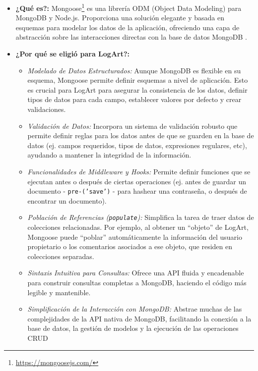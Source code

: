 \begin{itemize}
    \item \textbf{¿Qué es?:} Mongoose\footnote{\url{https://mongoosejs.com/}} es una librería ODM (Object Data Modeling) para MongoDB y Node.js. Proporciona una solución elegante y basada en esquemas para modelar los datos de la aplicación, ofreciendo una capa de abstracción sobre las interacciones directas con la base de datos MongoDB \cite{freecodecampMongooseIntro}.

    \item \textbf{¿Por qué se eligió para LogArt?:}
        \begin{itemize}
            \item \textit{Modelado de Datos Estructurados:} Aunque MongoDB es flexible en su esquema, Mongoose permite definir esquemas a nivel de aplicación. Esto es crucial para LogArt para asegurar la consistencia de los datos, definir tipos de datos para cada campo, establecer valores por defecto y crear validaciones.
            \item \textit{Validación de Datos:} Incorpora un sistema de validación robusto que permite definir reglas para los datos antes de que se guarden en la base de datos (ej. campos requeridos, tipos de datos, expresiones regulares, etc), ayudando a mantener la integridad de la información.
            \item \textit{Funcionalidades de Middleware y Hooks:} Permite definir funciones que se ejecutan antes o después de ciertas operaciones (ej. antes de guardar un documento - \texttt{pre-('save')} - para hashear una contraseña, o después de encontrar un documento).
            \item \textit{Población de Referencias (\texttt{populate}):} Simplifica la tarea de traer datos de colecciones relacionadas. Por ejemplo, al obtener un ``objeto'' de LogArt, Mongoose puede ``poblar'' automáticamente la información del usuario propietario o los comentarios asociados a ese objeto, que residen en colecciones separadas.
            \item \textit{Sintaxis Intuitiva para Consultas:} Ofrece una API fluida y encadenable para construir consultas completas a MongoDB, haciendo el código más legible y mantenible.
            \item \textit{Simplificación de la Interacción con MongoDB:} Abstrae muchas de las complejidades de la API nativa de MongoDB, facilitando la conexión a la base de datos, la gestión de modelos y la ejecución de las operaciones CRUD
        \end{itemize}
        

\end{itemize}
